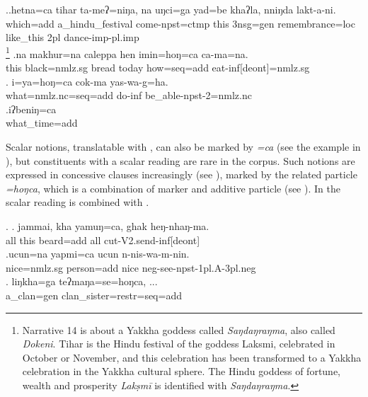 \ex.\ag.hetna=ca  tihar ta-meʔ=niŋa,  na uŋci=ga    yad=be khaʔla,   nniŋda lakt-a-ni.\\
which{\sc =add} a\_hindu\_festival come{\sc [3sg]-npst=ctmp} this {\sc 3nsg=gen} remembrance{\sc =loc} like\_this {\sc 2pl} dance{\sc -imp-pl.imp}\\
\footnote{Narrative 14 is about a Yakkha goddess called \emph{Saŋdaŋraŋma}, also called \emph{Dokeni}. Tihar is the Hindu festival of the goddess Laksmi, celebrated in October or November, and this celebration  has been transformed to a Yakkha celebration in the Yakkha cultural sphere. The Hindu goddess of fortune, wealth  and prosperity \emph{Lakṣmī } is identified with \emph{Saŋdaŋraŋma}.}
\bg.na   makhur=na        caleppa hen   imin=hoŋ=ca          ca-ma=na.\\
this black{\sc =nmlz.sg} bread today how{\sc =seq=add} eat{\sc -inf[deont]=nmlz.sg}\\
 
\bg. i=ya=hoŋ=ca                       cok-ma     yas-wa-g=ha.\\
what{\sc =nmlz.nc=seq=add} do{\sc -inf} be\_able{\sc -npst-2=nmlz.nc}\\
 
 \bg.iʔbeniŋ=ca\\
 what\_time{\sc =add}\\
  
  
 Scalar notions,  translatable with , can also be marked by \emph{=ca} (see the example in \Next), but constituents with a  scalar reading are rare in the corpus. Such notions are expressed in concessive clauses increasingly (see ), marked by the related particle \emph{=hoŋca}, which is a combination of  marker and additive particle (see \Next[c]). In \Next[c] the scalar reading is combined with  . 
 
\ex. \ag.      jammai, kha  yamuŋ=ca,       ghak heŋ-nhaŋ-ma.\\
all this beard{\sc =add} all cut{\sc -V2.send-inf[deont]}\\
\bg.ucun=na        yapmi=ca         ucun n-nis-wa-m-nin.\\
nice{\sc =nmlz.sg} person{\sc =add} nice {\sc neg-}see{\sc -npst-1pl.A-3pl.neg}\\
  
\bg. liŋkha=ga      teʔmaŋa=se=hoŋca, ...\\
a\_clan{\sc =gen} clan\_sister{\sc =restr=seq=add}\\
 

